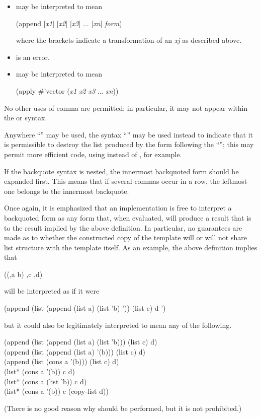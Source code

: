 \begin{flushdesc}
\begin{itemize}
\item
{} may be interpreted to mean
\begin{lisp}
(append \textrm{[}\emph{x1}\textrm{]} \textrm{[}\emph{x2}\textrm{]}
    \textrm{[}\emph{x3}\textrm{]} ... \textrm{[}\emph{xn}\textrm{]} \emph{form})
\end{lisp}
where the brackets indicate a transformation of an \emph{xj} as described above.

\item
{} is an error.

\item
{} may be interpreted to mean
\begin{lisp}
(apply \#'vector {\Xbq}(\emph{x1} \emph{x2} \emph{x3} ... \emph{xn}))
\end{lisp}
\end{itemize}

No other uses of comma are permitted; in particular, it may not appear within
the  or  syntax.

Anywhere ``\cd{,{\Xatsign}}'' may be used, the syntax ``'' may be used instead
to indicate that it is permissible to destroy the list produced by the form
following the ``''; this may permit more efficient code, using
 instead of , for example.

If the backquote syntax is nested, the innermost backquoted form
should be expanded first.  This means that if several commas occur
in a row, the leftmost one belongs to the innermost backquote.

Once again, it is emphasized that an implementation is free to interpret
a backquoted form as any form that, when evaluated, will produce a result
that is  to the result implied by the above definition.
In particular, no guarantees are made as to whether the constructed
copy of the template will or will not share list structure with the
template itself.  As an example, the above definition implies that
\begin{lisp}
{\Xbq}((,a b) ,c ,{\Xatsign}d)
\end{lisp}
will be interpreted as if it were
\begin{lisp}
(append (list (append (list a) (list 'b) '{\nil})) (list c) d '{\nil})
\end{lisp}
but it could also be legitimately interpreted to mean any of the following.
\begin{lisp}
(append (list (append (list a) (list 'b))) (list c) d) \\
(append (list (append (list a) '(b))) (list c) d) \\
(append (list (cons a '(b))) (list c) d) \\
(list* (cons a '(b)) c d) \\
(list* (cons a (list 'b)) c d) \\
(list* (cons a '(b)) c (copy-list d))
\end{lisp}
(There is no good reason why  should be performed, but
it is not prohibited.)


\end{flushdesc}
